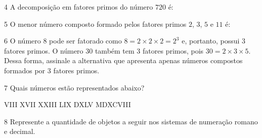 \num{4} A decomposição em fatores primos do número $720$ é:


\num{5}  O menor número composto formado pelos fatores primos $2$, $3$, $5$ e $11$ é:


\num{6}  O número $8$ pode ser fatorado como $8 = 2\times 2\times 2 = 2^3$ e, portanto,
possui $3$ fatores primos. O número $30$ também tem $3$ fatores primos, pois
$30 = 2\times 3\times 5$. Dessa forma, assinale a alternativa que apresenta apenas
números compostos formados por $3$ fatores primos.


\num{7}  Quais números estão representados abaixo?

\begin{mdframed}[linewidth=2pt,linecolor=azul!20,backgroundcolor=azul!20,roundcorner=2pt]
VIII \hfill XVII \hfill XXIII \hfill LIX \hfill DXLV \hfill MDXCVIII
\end{mdframed}



\num{8}  Represente a quantidade de objetos a seguir nos sistemas de numeração
romano e decimal.

\begin{escolha}
\item {}
\item {}
\item {}
\end{escolha}




